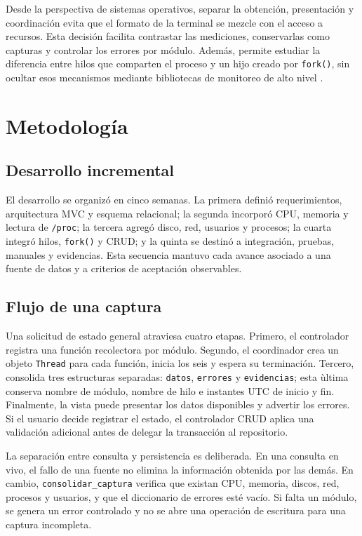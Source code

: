 \documentclass[conference]{IEEEtran}
\begin{document}
Desde la perspectiva de sistemas operativos, separar la obtenci\'on, presentaci\'on y coordinaci\'on evita que el formato de la terminal se mezcle con el acceso a recursos. Esta decisi\'on facilita contrastar las mediciones, conservarlas como capturas y controlar los errores por m\'odulo. Adem\'as, permite estudiar la diferencia entre hilos que comparten el proceso y un hijo creado por \texttt{fork()}, sin ocultar esos mecanismos mediante bibliotecas de monitoreo de alto nivel \cite{silberschatz2019}.

\section{Metodolog\'ia}
\subsection{Desarrollo incremental}
El desarrollo se organiz\'o en cinco semanas. La primera defini\'o requerimientos, arquitectura MVC y esquema relacional; la segunda incorpor\'o CPU, memoria y lectura de \texttt{/proc}; la tercera agreg\'o disco, red, usuarios y procesos; la cuarta integr\'o hilos, \texttt{fork()} y CRUD; y la quinta se destin\'o a integraci\'on, pruebas, manuales y evidencias. Esta secuencia mantuvo cada avance asociado a una fuente de datos y a criterios de aceptaci\'on observables.

\subsection{Flujo de una captura}
Una solicitud de estado general atraviesa cuatro etapas. Primero, el controlador registra una funci\'on recolectora por m\'odulo. Segundo, el coordinador crea un objeto \texttt{Thread} para cada funci\'on, inicia los seis y espera su terminaci\'on. Tercero, consolida tres estructuras separadas: \texttt{datos}, \texttt{errores} y \texttt{evidencias}; esta \`ultima conserva nombre de m\'odulo, nombre de hilo e instantes UTC de inicio y fin. Finalmente, la vista puede presentar los datos disponibles y advertir los errores. Si el usuario decide registrar el estado, el controlador CRUD aplica una validaci\'on adicional antes de delegar la transacci\'on al repositorio.

La separaci\'on entre consulta y persistencia es deliberada. En una consulta en vivo, el fallo de una fuente no elimina la informaci\'on obtenida por las dem\'as. En cambio, \texttt{consolidar\_captura} verifica que existan CPU, memoria, discos, red, procesos y usuarios, y que el diccionario de errores est\'e vac\'io. Si falta un m\'odulo, se genera un error controlado y no se abre una operaci\'on de escritura para una captura incompleta.
\end{document}
